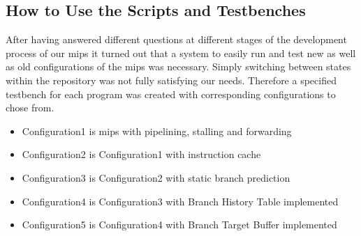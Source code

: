 
\subsection{How to Use the Scripts and Testbenches}
\label{sec:howToUseScripts}

After having answered different questions at different stages of the development process of our mips it turned out that a system to easily run and test new as well as old configurations of the mips was necessary. Simply switching between states within the repository was not fully satisfying our needs. Therefore a specified testbench for each program was created with corresponding configurations to chose from.





\begin{itemize}
	\item Configuration1 is mips with pipelining, stalling and forwarding
	\item Configuration2 is Configuration1 with instruction cache
	\item Configuration3 is Configuration2 with static branch prediction
	\item Configuration4 is Configuration3 with Branch History Table implemented
	\item Configuration5 is Configuration4 with Branch Target Buffer implemented
\end{itemize}





\begin{table}[h]
	\end{table}

